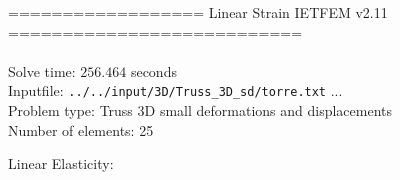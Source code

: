 \documentclass[a4paper,11pt]{article}
\begin{document}

================== Linear Strain IETFEM v2.11 ===========================\\\\


Solve time: $256.464$ seconds \\

Inputfile: \verb|../../input/3D/Truss_3D_sd/torre.txt|  ... \\

Problem type: Truss 3D small deformations and displacements\\ 

Number of elements: 25 \\

\newpage       

Linear Elasticity:\\
\end{document}
